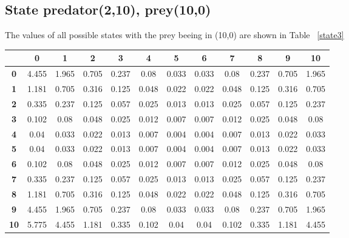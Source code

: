 \documentclass[11pt]{article}
\begin{document}
\subsection{State predator(2,10), prey(10,0)}

The values of all possible states with the prey beeing in (10,0) are shown in Table ~\ref{state3}

\begin{center}
\begin{table*}[ht]
{\small
\hfill{}
\begin{tabular}{c|c|c|c|c|c|c|c|c|c|c|c}
\textbf{} & \textbf{0} & \textbf{1} & \textbf{2} & \textbf{3} & \textbf{4} & \textbf{5} & \textbf{6} & \textbf{7} & \textbf{8} & \textbf{9} & \textbf{10}\\
	\hline
\textbf{0}& 4.455	& 1.965	& 0.705	& 0.237	& 0.08	& 0.033	& 0.033	& 0.08	& 0.237	& 0.705	& 1.965	\\
\textbf{1}& 1.181	& 0.705	& 0.316	& 0.125	& 0.048	& 0.022	& 0.022	& 0.048	& 0.125	& 0.316	& 0.705	\\
\textbf{2}& 0.335	& 0.237	& 0.125	& 0.057	& 0.025	& 0.013	& 0.013	& 0.025	& 0.057	& 0.125	& 0.237	\\
\textbf{3}& 0.102	& 0.08	& 0.048	& 0.025	& 0.012	& 0.007	& 0.007	& 0.012	& 0.025	& 0.048	& 0.08	\\
\textbf{4}& 0.04	& 0.033	& 0.022	& 0.013	& 0.007	& 0.004	& 0.004	& 0.007	& 0.013	& 0.022	& 0.033	\\
\textbf{5}& 0.04	& 0.033	& 0.022	& 0.013	& 0.007	& 0.004	& 0.004	& 0.007	& 0.013	& 0.022	& 0.033	\\
\textbf{6}& 0.102	& 0.08	& 0.048	& 0.025	& 0.012	& 0.007	& 0.007	& 0.012	& 0.025	& 0.048	& 0.08	\\
\textbf{7}& 0.335	& 0.237	& 0.125	& 0.057	& 0.025	& 0.013	& 0.013	& 0.025	& 0.057	& 0.125	& 0.237	\\
\textbf{8}& 1.181	& 0.705	& 0.316	& 0.125	& 0.048	& 0.022	& 0.022	& 0.048	& 0.125	& 0.316	& 0.705	\\
\textbf{9}& 4.455	& 1.965	& 0.705	& 0.237	& 0.08	& 0.033	& 0.033	& 0.08	& 0.237	& 0.705	& 1.965	\\
\textbf{10}& 5.775	& 4.455	& 1.181	& 0.335	& 0.102	& 0.04	& 0.04	& 0.102	& 0.335	& 1.181	& 4.455	\\
\end{tabular}}
\hfill{}
\caption{Policy evaluation of state predator(2,10), prey(10,0)}
\label{state3}
\end{table*}
\end{center}	
\end{document}

